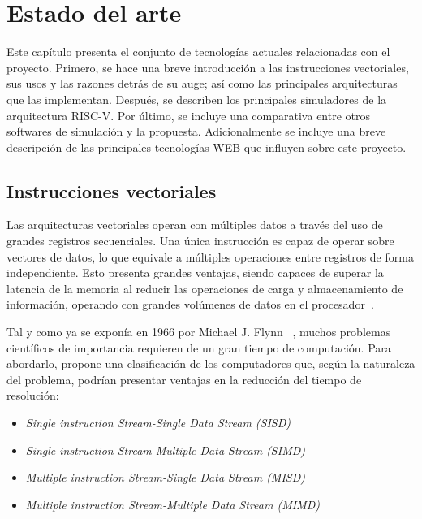 \chapter{Estado del arte}\label{chap:state-of-the-art}

Este capítulo presenta el conjunto de tecnologías actuales relacionadas con el
proyecto. Primero, se hace una breve introducción a las instrucciones vectoriales, sus
usos y las razones detrás de su auge; así como las principales arquitecturas
que las implementan. Después, se describen los principales simuladores de la
arquitectura RISC-V. Por último, se incluye una comparativa entre otros softwares de simulación y la
propuesta. Adicionalmente se incluye una breve descripción de las principales tecnologías WEB que influyen sobre este proyecto.

\section{Instrucciones vectoriales}\label{vector-instructions}

Las arquitecturas vectoriales operan con múltiples datos a través del uso de
grandes registros secuenciales. Una única instrucción es capaz de operar sobre
vectores de datos, lo que equivale a múltiples operaciones entre registros de
forma independiente. Esto presenta grandes ventajas, siendo capaces de superar
la latencia de la memoria al reducir las operaciones de carga y almacenamiento
de información, operando con grandes volúmenes de datos en el
procesador~\cite{hennessy2011computer}.

Tal y como ya se exponía en 1966 por Michael J. Flynn ~\cite{1447203}, muchos
problemas científicos de importancia requieren de un gran tiempo de
computación. Para abordarlo, propone una clasificación de los computadores que, según la naturaleza del problema, podrían presentar ventajas en la reducción del
tiempo de resolución:

\begin{itemize}
    \item \textit{Single instruction Stream-Single Data Stream (SISD)}
    \item \textit{Single instruction Stream-Multiple Data Stream (SIMD)}
    \item \textit{Multiple instruction Stream-Single Data Stream (MISD)}
    \item \textit{Multiple instruction Stream-Multiple Data Stream (MIMD)}
\end{itemize}

